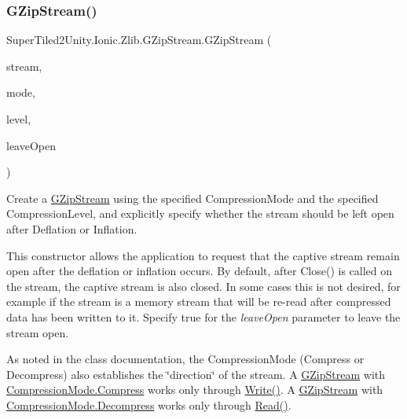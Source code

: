 \subsubsection{\texorpdfstring{G\+Zip\+Stream()}{GZipStream()}\hspace{0.1cm}{\footnotesize\ttfamily [4/4]}}
{\footnotesize\ttfamily Super\+Tiled2\+Unity.\+Ionic.\+Zlib.\+G\+Zip\+Stream.\+G\+Zip\+Stream (\begin{DoxyParamCaption}\item[{Stream}]{stream,  }\item[{\mbox{\hyperlink{namespace_super_tiled2_unity_1_1_ionic_1_1_zlib_ad5b7635d92497e1c905e5de82eb1c6b1}{Compression\+Mode}}}]{mode,  }\item[{\mbox{\hyperlink{namespace_super_tiled2_unity_1_1_ionic_1_1_zlib_a20f6771804996c363f454ad9765cd7db}{Compression\+Level}}}]{level,  }\item[{bool}]{leave\+Open }\end{DoxyParamCaption})}



Create a {\ttfamily \mbox{\hyperlink{class_super_tiled2_unity_1_1_ionic_1_1_zlib_1_1_g_zip_stream}{G\+Zip\+Stream}}} using the specified {\ttfamily Compression\+Mode} and the specified {\ttfamily Compression\+Level}, and explicitly specify whether the stream should be left open after Deflation or Inflation. 

This constructor allows the application to request that the captive stream remain open after the deflation or inflation occurs. By default, after {\ttfamily Close()} is called on the stream, the captive stream is also closed. In some cases this is not desired, for example if the stream is a memory stream that will be re-\/read after compressed data has been written to it. Specify true for the {\itshape leave\+Open}  parameter to leave the stream open. 

As noted in the class documentation, the {\ttfamily Compression\+Mode} (Compress or Decompress) also establishes the \char`\"{}direction\char`\"{} of the stream. A {\ttfamily \mbox{\hyperlink{class_super_tiled2_unity_1_1_ionic_1_1_zlib_1_1_g_zip_stream}{G\+Zip\+Stream}}} with {\ttfamily \mbox{\hyperlink{namespace_super_tiled2_unity_1_1_ionic_1_1_zlib_ad5b7635d92497e1c905e5de82eb1c6b1a8fa4fcfcda70410e089984d5f51ae97d}{Compression\+Mode.\+Compress}}} works only through {\ttfamily \mbox{\hyperlink{class_super_tiled2_unity_1_1_ionic_1_1_zlib_1_1_g_zip_stream_a49032afb5806563236a5d53841abe2b8}{Write()}}}. A {\ttfamily \mbox{\hyperlink{class_super_tiled2_unity_1_1_ionic_1_1_zlib_1_1_g_zip_stream}{G\+Zip\+Stream}}} with {\ttfamily \mbox{\hyperlink{namespace_super_tiled2_unity_1_1_ionic_1_1_zlib_ad5b7635d92497e1c905e5de82eb1c6b1a6d2861192fdf4370bcf95c099be0f2f0}{Compression\+Mode.\+Decompress}}} works only through {\ttfamily \mbox{\hyperlink{class_super_tiled2_unity_1_1_ionic_1_1_zlib_1_1_g_zip_stream_a772b5013a585850ffaf8be4aa7f3dbcf}{Read()}}}. 

